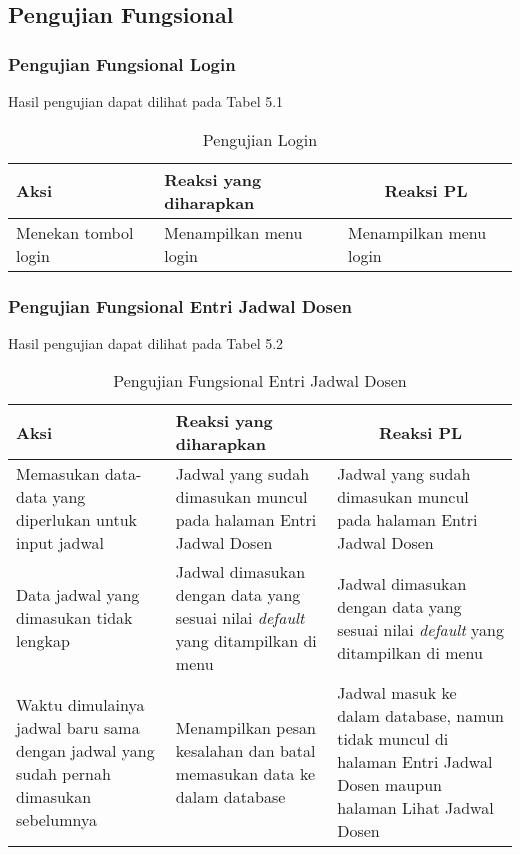\subsection{Pengujian Fungsional}
\subsubsection{Pengujian Fungsional Login}
Hasil pengujian dapat dilihat pada Tabel 5.1
\begin{center}
	\begin{table}[H]
		\begin{tabular}{|p{5cm}|p{5cm}|p{5cm}|}
		\hline
		\centering Aksi	& 	\centering Reaksi yang diharapkan &  \multicolumn{1}{c|}{Reaksi PL} \\
		\hline
		Menekan tombol login & Menampilkan menu login & Menampilkan menu login \\
		\hline
		\end{tabular}
		\caption{Pengujian Login}
	\end{table}
\end{center}

\subsubsection{Pengujian Fungsional Entri Jadwal Dosen}
Hasil pengujian dapat dilihat pada Tabel 5.2
\begin{center}
	\begin{table}[H]
		\begin{tabular}{|p{5cm}|p{5cm}|p{5cm}|}
		\hline
		\centering Aksi	& 	\centering Reaksi yang diharapkan &  \multicolumn{1}{c|}{Reaksi PL} \\
		\hline
		Memasukan data-data yang diperlukan untuk input jadwal & Jadwal yang sudah dimasukan muncul pada halaman Entri Jadwal Dosen & Jadwal yang sudah dimasukan muncul pada halaman Entri Jadwal Dosen \\
		\hline
		Data jadwal yang dimasukan tidak lengkap & Jadwal dimasukan dengan data yang sesuai nilai \textit{default} yang ditampilkan di menu & Jadwal dimasukan dengan data yang sesuai nilai \textit{default} yang ditampilkan di menu \\
		\hline
		Waktu dimulainya jadwal baru sama dengan jadwal yang sudah pernah dimasukan sebelumnya & Menampilkan pesan kesalahan dan batal memasukan data ke dalam database & Jadwal masuk ke dalam database, namun tidak muncul di halaman Entri Jadwal Dosen maupun halaman Lihat Jadwal Dosen \\
		\hline
		\end{tabular}
		\caption{Pengujian Fungsional Entri Jadwal Dosen}
	\end{table}
\end{center}

